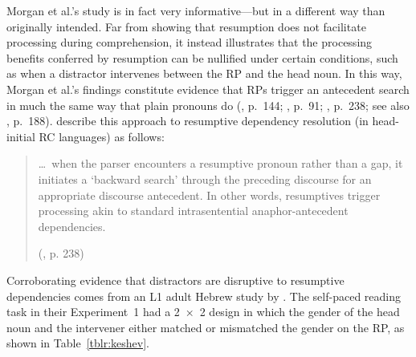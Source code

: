Morgan et al.'s study is in fact very informative---but in a different way than originally intended. Far from showing that resumption does not facilitate processing during comprehension, it instead illustrates that the processing benefits conferred by resumption can be nullified under certain conditions, such as when a distractor intervenes between the RP and the head noun. In this way, Morgan et al.'s findings constitute evidence that RPs trigger an antecedent search in much the same way that plain pronouns do (\cite{alexopoulou.keller2007}, p.~144; \cite{erteschik-shir1992}, p.~91; \cite{hofmeister.norcliffe2013}, p.~238; see also \cite{meltzer-asscher2021}, p.~188). \textcite{hofmeister.norcliffe2013} describe this approach to resumptive dependency resolution (in head-initial RC languages) as follows:

\begin{quote}\begin{samepage}
\dots ~when the parser encounters a resumptive pronoun rather than a gap, it initiates a `backward search' through the preceding discourse for an appropriate discourse antecedent. In other words, resumptives trigger processing akin to standard intrasentential anaphor-antecedent dependencies.\par\nobreak\vspace{5pt}
\hfill (\cite{hofmeister.norcliffe2013}, p. 238)
\end{samepage}\end{quote}\vspace{-12pt}

Corroborating evidence that distractors are disruptive to resumptive dependencies comes from an L1 adult Hebrew study by \textcite{keshev.etal2019}. The self-paced reading task in their Experiment~1 had a 2~×~2 design in which the gender of the head noun and the intervener either matched or mismatched the gender on the RP, as shown in Table~\ref{tblr:keshev}.

